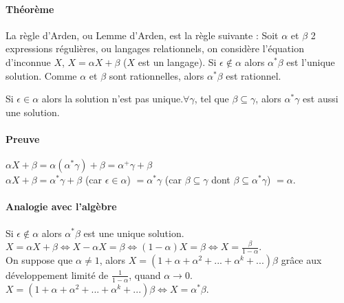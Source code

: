 

\paragraph{Théorème} %
\label{par:th_or_me}

La règle d'Arden, ou Lemme d'Arden, est la règle suivante : Soit $\alpha$ et $\beta$ 2 expressions régulières, ou langages relationnels, on considère l'équation d'inconnue $X$, $X = \alpha X + \beta$ ($X$ est un langage). Si $\epsilon \not \in \alpha$ alors $\alpha^* \beta$ est l'unique solution. Comme $\alpha$ et $\beta$ sont rationnelles, alors $\alpha^* \beta$ est rationnel.


Si $\epsilon \in \alpha$ alors la solution n'est pas unique.$\forall \gamma$, tel que $\beta \subseteq \gamma$, alors $\alpha^* \gamma$ est aussi une solution.


\paragraph{Preuve} %
\label{par:preuve}

$\alpha X + \beta = \alpha (\alpha^* \gamma) + \beta = \alpha^+ \gamma + \beta$\\
$\alpha X + \beta = \alpha^* \gamma + \beta$ (car $\epsilon \in \alpha$) $ = \alpha^* \gamma$ (car $\beta \subseteq \gamma$ dont $\beta \subseteq \alpha^* \gamma$) $= \alpha$.



\paragraph{Analogie avec l'algèbre} %
\label{par:analogie_avec_l_alg_bre}

Si $\epsilon \not \in \alpha$ alors $\alpha^* \beta$ est une unique solution.\\
$X = \alpha X + \beta \Leftrightarrow X - \alpha X = \beta \Leftrightarrow (1-\alpha) X = \beta \Leftrightarrow X = \frac{\beta}{1-\alpha}$.\\
On suppose que $\alpha \not = 1$, alors $X = (1 + \alpha + \alpha^2 + ... + \alpha^k + ... )\beta$ grâce aux développement limité de $\frac{1}{1-\alpha}$, quand $\alpha \rightarrow 0$.\\
$X = (1 + \alpha + \alpha^2 + ... + \alpha^k + ... )\beta \Leftrightarrow X = \alpha^* \beta$.

